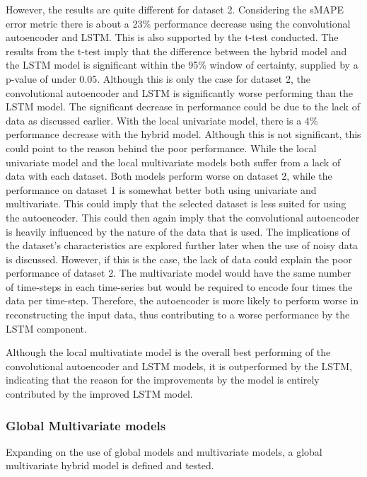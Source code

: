 However, the results are quite different for dataset 2.
Considering the sMAPE error metric there is about a 23\% performance decrease using the convolutional autoencoder and LSTM.
This is also supported by the t-test conducted. The results from the t-test imply that the difference between the hybrid model and the LSTM model
is significant within the 95\% window of certainty, supplied by a p-value of under 0.05.
Although this is only the case for dataset 2, the convolutional autoencoder and LSTM is significantly worse performing than the LSTM model.
The significant decrease in performance could be due to the lack of data as discussed earlier.
With the local univariate model, there is a 4\% performance decrease with the hybrid model.
Although this is not significant, this could point to the reason behind the poor performance.
While the local univariate model and the local multivariate models both suffer from a lack of data with each dataset.
Both models perform worse on dataset 2, while the performance on dataset 1 is somewhat better both using univariate and multivariate.
This could imply that the selected dataset is less suited for using the autoencoder.
This could then again imply that the convolutional autoencoder is heavily influenced by the nature of the data that is used.
The implications of the dataset's characteristics are explored further later when the use of noisy data is discussed.
However, if this is the case, the lack of data could explain the poor performance of dataset 2.
The multivariate model would have the same number of time-steps in each time-series but would be required to encode four times the data per time-step.
Therefore, the autoencoder is more likely to perform worse in reconstructing the input data,
thus contributing to a worse performance by the LSTM component.


Although the local multivatiate model is the overall best performing of the convolutional autoencoder and LSTM models,
it is outperformed by the LSTM, indicating that the reason for the improvements by the model
is entirely contributed by the improved LSTM model.





\subsubsection{Global Multivariate models}

Expanding on the use of global models and multivariate models,
a global multivariate hybrid model is defined and tested.

